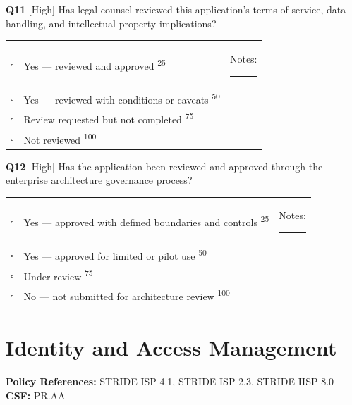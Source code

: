 \documentclass[11pt,landscape]{article}
\begin{document}
\vspace{0.3cm}

\noindent\colorbox{highbg}{\textbf{Q11} [High]} Has legal counsel reviewed this application's terms of service, data handling, and intellectual property implications?

\begin{tabularx}{\textwidth}{cXX}
$\square$ & Yes --- reviewed and approved \textsuperscript{\scriptsize\textcolor{stridegray}{25}} & Notes: \rule{4cm}{0.4pt} \\
$\square$ & Yes --- reviewed with conditions or caveats \textsuperscript{\scriptsize\textcolor{stridegray}{50}} &  \\
$\square$ & Review requested but not completed \textsuperscript{\scriptsize\textcolor{stridegray}{75}} &  \\
$\square$ & Not reviewed \textsuperscript{\scriptsize\textcolor{stridegray}{100}} &  \\
\end{tabularx}

\vspace{0.3cm}

\noindent\colorbox{highbg}{\textbf{Q12} [High]} Has the application been reviewed and approved through the enterprise architecture governance process?

\begin{tabularx}{\textwidth}{cXX}
$\square$ & Yes --- approved with defined boundaries and controls \textsuperscript{\scriptsize\textcolor{stridegray}{25}} & Notes: \rule{4cm}{0.4pt} \\
$\square$ & Yes --- approved for limited or pilot use \textsuperscript{\scriptsize\textcolor{stridegray}{50}} &  \\
$\square$ & Under review \textsuperscript{\scriptsize\textcolor{stridegray}{75}} &  \\
$\square$ & No --- not submitted for architecture review \textsuperscript{\scriptsize\textcolor{stridegray}{100}} &  \\
\end{tabularx}

\vspace{0.3cm}

\newpage

\section{Identity and Access Management}

\textbf{Policy References:} STRIDE ISP 4.1, STRIDE ISP 2.3, STRIDE IISP 8.0 \hfill \textbf{CSF:} PR.AA
\end{document}
